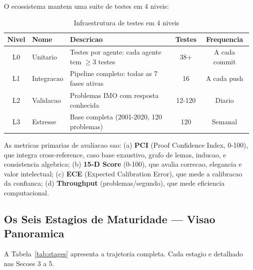 \documentclass[5p]{elsarticle}
\begin{document}
O ecossistema mantem uma suite de testes em 4 niveis:

\begin{table}[H]
  \centering
  \caption{Infraestrutura de testes em 4 niveis}
  \label{tab:testing}
  \small
  \begin{tabular}{clp{5cm}cc}
    \toprule
    \textbf{Nivel} & \textbf{Nome} & \textbf{Descricao} & \textbf{Testes} & \textbf{Frequencia} \\
    \midrule
    L0 & Unitario & Testes por agente: cada agente tem $\geq 3$ testes & 38+ & A cada commit \\
    L1 & Integracao & Pipeline completo: todas as 7 fases ativas & 16 & A cada push \\
    \rowcolor{bluebg}
    L2 & Validacao & Problemas IMO com resposta conhecida & 12-120 & Diario \\
    L3 & Estresse & Base completa (2001-2020, 120 problemas) & 120 & Semanal \\
    \bottomrule
  \end{tabular}
\end{table}

As metricas primarias de avaliacao sao: (a) \textbf{PCI} (Proof Confidence
Index, 0-100), que integra cross-reference, caso base exaustivo, grafo de
lemas, inducao, e consistencia algebrica; (b) \textbf{15-D Score} (0-100),
que avalia correcao, elegancia e valor intelectual; (c) \textbf{ECE} (Expected
Calibration Error), que mede a calibracao da confianca; (d) \textbf{Throughput}
(problemas/segundo), que mede eficiencia computacional.

\subsection{Os Seis Estagios de Maturidade — Visao Panoramica}

A Tabela~\ref{tab:stages} apresenta a trajetoria completa. Cada estagio e
detalhado nas Secoes 3 a 5.
\end{document}
